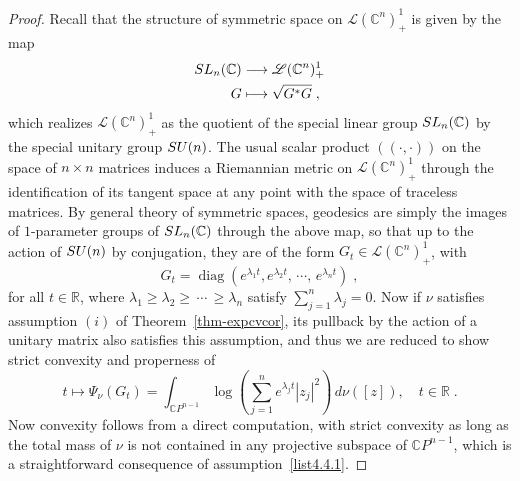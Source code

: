 \documentclass[11pt]{article}
\theoremstyle{definition}
\numberwithin{equation}{section}
\numberwithin{figure}{section}
\numberwithin{table}{section}
\DeclareMathOperator{\diag}{diag}
\newcommand{\R}{{\mathbb{R}}}
\newcommand{\CCC}{{\mathbb{C}}}
\renewcommand\geq {\geqslant}
\newcommand\< {\mathcal{h}}
\renewcommand\> {\mathcal{i}}
\newcommand*\cL{\mathscr{L}}
\begin{document}
\begin{proof}
Recall that the structure of symmetric space on $\cL(\CCC^n)_+^1$ is given by the map
\begin{equation}
\begin{split}
\textup{SL}_n(\CCC)&\longrightarrow\cL(\CCC^n)_+^1\\
G&\longmapsto \sqrt{G^*G}\;,
\end{split}
\end{equation}
which realizes $\cL(\CCC^n)_+^1$ as the quotient of the special linear group $\textup{SL}_n(\CCC)$ by the special unitary group $\textup{SU}(n)$. The usual scalar product $((\cdot,\cdot))$ on the space of $n \times n$ matrices induces a Riemannian metric on $\cL(\CCC^n)_+^1$ through the identification of its tangent space at any point with the space of traceless matrices. By general theory of symmetric spaces, geodesics are simply the images of $1$-parameter groups of $\textup{SL}_n(\CCC)$ through the above map, so that up to the action of $\textup{SU}(n)$ by conjugation, they are of the form $G_t\in\cL(\CCC^n)_+^1$, with
\begin{equation}
G_t=\diag(e^{\lambda_1 t},e^{\lambda_2 t},\,\cdots,\,e^{\lambda_n t})\;,
\end{equation}
for all $t\in\R$, where $\lambda_1\geq\lambda_2\geq\,\cdots\,\geq\lambda_n$ satisfy $\sum_{j=1}^n\lambda_j=0$. Now if $\nu$ satisfies assumption $(i)$ of Theorem~\ref{thm-expcvcor}, its pullback by the action of a unitary matrix also satisfies this assumption, and thus we are reduced to show strict convexity and properness of
\begin{equation}
t\longmapsto\Psi_\nu(G_t)=\int_{\CCC P^{n-1}}\log\left(\sum_{j=1}^ne^{\lambda_j t} |z_j|^2\right)\,d\nu([z]),\quad t\in\R\;.
\end{equation}
Now convexity follows from a direct computation, with strict convexity as long as the total mass of $\nu$ is not contained in any projective subspace of $\CCC P^{n-1}$, which is a straightforward consequence of assumption~\eqref{list4.4.1}.


\end{proof}
\end{document}
